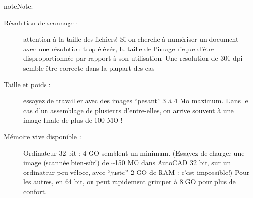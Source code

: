 \documentclass[a4paper,12pt,french]{sphinxmanual}
\begin{document}
\begin{notice}{note}{Note:}\begin{description}
\item[{Résolution de scannage :}] \leavevmode
attention à la taille des fichiers! Si on cherche à numériser un document avec une résolution trop élévée, la taille de l'image risque d'être disproportionnée par rapport à son utilisation. Une résolution de 300 dpi semble être correcte dans la plupart des cas

\item[{Taille et poids :}] \leavevmode
essayez de travailler avec des images ``pesant'' 3 à 4 Mo maximum. Dans le cas d'un assemblage de plusieurs d'entre-elles, on arrive souvent à une image finale de plus de 100 MO !

\item[{Mémoire vive disponible :}] \leavevmode
Ordinateur 32 bit : 4 GO semblent un minimum. (Essayez de charger une image (scannée bien-sûr!) de \textasciitilde{}150 MO dans AutoCAD 32 bit, sur un ordinateur peu véloce, avec ``juste'' 2 GO de RAM : c'est impossible!)
Pour les autres, en 64 bit, on peut rapidement grimper à 8 GO pour plus de confort.

\end{description}
\end{notice}
\end{document}
